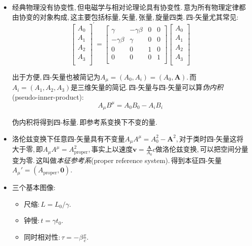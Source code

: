 \begin{itemize}
\item 经典物理没有协变性,\,但电磁学与相对论理论具有协变性.\,意为所有物理定律都由协变的对象构成,\,这主要包括标量,\,矢量,\,张量,\,旋量四类.\,四-矢量尤其常见:
\[\left[ \begin{array}{c}
	A_0\\
	A_1\\
	A_2\\
	A_3\\
\end{array} \right] ^{'} =\left[ \begin{matrix}
	\gamma&		-\gamma \beta&		0&		0\\
	-\gamma \beta&		\gamma&		0&		0\\
	0&		0&		1&		0\\
	0&		0&		0&		1\\
\end{matrix} \right] \left[ \begin{array}{c}
	A_0\\
	A_1\\
	A_2\\
	A_3\\
\end{array} \right] \]

出于方便,\,四-矢量也被简记为$A_{\mu}=\left( A_0, A_i \right) =\left( A_0, \boldsymbol{A} \right) $.\,而$A_i=\left( A_1, A_2, A_3 \right) $是三维矢量的简记.\,四-矢量与四-矢量可以算\emph{伪内积}(pseudo-inner-product):
\[A_{\mu}B^{\mu}=A_0B_0-A_iB_i\]

伪内积将得到四-标量.\,即参考系变换下不变的量.

\item 洛伦兹变换下任意四-矢量具有不变量$A_{\mu}A^{\mu}=A_{0}^{2}-\boldsymbol{A}^2$,\,对于类时四-矢量这将大于零,\,即$A_{\mu}A^{\mu}=A_{\text{proper}}^2$,\,事实上以速度$\boldsymbol{v}=\frac{\boldsymbol{A}}{A_0}c$做洛伦兹变换,\,可以把空间分量变为零.\,这叫做\emph{本征参考系}(proper reference system).\,得到本征四-矢量$A_{\mu}'=\left( A_{\text{proper}}, \mathbf{0} \right)$.

\item 三个基本图像:

\begin{itemize}
\item 尺缩:\,$L=L_0/\gamma$.

\item 钟慢:\,$t=\gamma t_0$.

\item 同时相对性:\,$\tau=-\beta \frac{x}{c}$.

\end{itemize}


\end{itemize}
